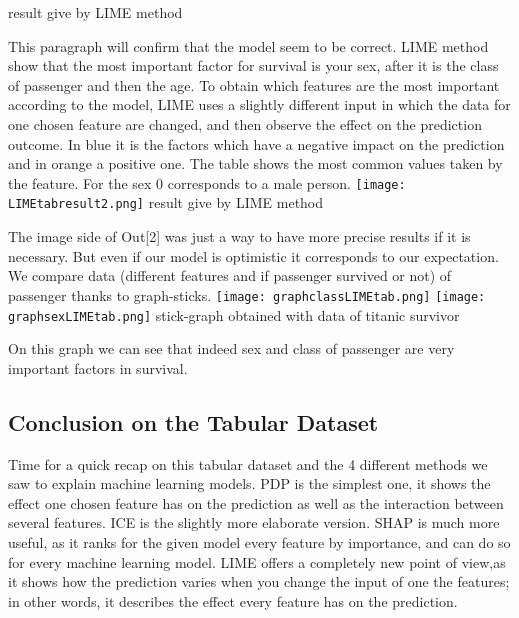 \documentclass[sigplan,screen]{acmart}
\begin{document}
        \small result give by LIME method
        \newline

   
\Large
This paragraph will confirm that the model seem to be correct. LIME method show that the most important factor for survival is your sex, after it is the class of passenger and then the age. To obtain which features are the most important according to the model, LIME uses a slightly different input in which the data for one chosen feature are changed, and then observe the effect on the prediction outcome. In blue it is the factors which have a negative impact on the prediction and in orange a positive one. The table shows the most common values taken by the feature. For the sex 0 corresponds to a male person.
\newline
    \centering
        \texttt{[image: LIMEtabresult2.png]}
        \small result give by LIME method
        \newline

\Large
The image side of Out[2] was just a way to have more precise results if it is necessary.
But even if our model is optimistic it corresponds to our expectation. We compare data (different features and if passenger survived or not) of passenger thanks to graph-sticks.
    \newline
    \centering
        \texttt{[image: graphclassLIMEtab.png]}
        \texttt{[image: graphsexLIMEtab.png]}
        \small stick-graph obtained with data of titanic survivor
        \newline
        
\Large
On this graph we can see that indeed sex and class of passenger are very important factors in survival.

\subsection{Conclusion on the Tabular Dataset}
Time for a quick recap on this tabular dataset and the 4 different methods we saw to explain machine learning models. PDP is the simplest one, it shows the effect one chosen feature has on the prediction as well as the interaction between several features. ICE is the slightly more elaborate version. SHAP is much more useful, as it ranks for the given model every feature by importance, and can do so for every machine learning model. LIME offers a completely new point of view,as it shows how the prediction varies when you change the input of one the features; in other words, it describes the effect every feature has on the prediction.
\end{document}
